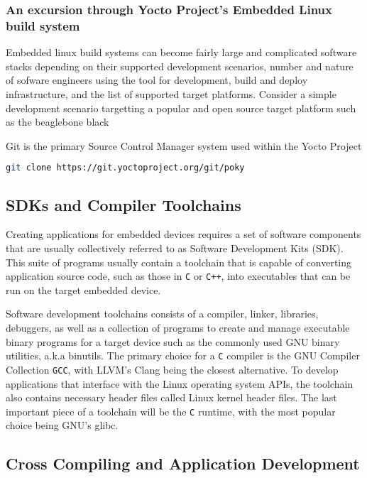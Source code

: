 
\subsubsection{An excursion through Yocto Project's Embedded Linux build system}

Embedded linux build systems can become fairly large and complicated software stacks depending on their supported development scenarios, number and nature of sofware engineers using the tool for development, build and deploy infrastructure, and the list of supported target platforms. Consider a simple development scenario targetting a popular and open source target platform such as the beaglebone black

Git is the primary Source Control Manager system used within the Yocto Project

\begin{lstlisting}[language=Bash]
	git clone https://git.yoctoproject.org/git/poky
\end{lstlisting}

\subsection{SDKs and Compiler Toolchains}

Creating applications for embedded devices requires a set of software components that are usually collectively referred to as Software Development Kits (SDK). This suite of programs usually contain a toolchain that is capable of converting application source code, such as those in \texttt{C}  or \texttt{C++}, into executables that can be run on the target embedded device.

Software development toolchains consists of a compiler, linker, libraries, debuggers, as well as a collection of programs to create and manage executable binary programs for a target device such as the commonly used GNU binary utilities, a.k.a binutils. The primary choice for a \texttt{C} compiler is the GNU Compiler Collection \texttt{GCC}, with LLVM's Clang being the closest alternative. To develop applications that interface with the Linux operating system APIs, the toolchain also contains necessary header files called Linux kernel header files. The last important piece of a toolchain will be the \texttt{C} runtime, with the most popular choice being GNU's glibc.

\subsection{Cross Compiling and Application Development}

